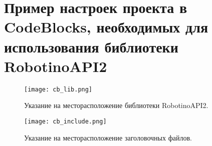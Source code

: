 \chapter{Пример настроек проекта в CodeBlocks, необходимых для использования библиотеки RobotinoAPI2}\label{app_codeblocks_settings}

\begin{figure}[h!]
	\centering
	\texttt{[image: cb\_lib.png]}
	\caption{Указание на месторасположение библиотеки RobotinoAPI2.}
\end{figure}

\begin{figure}[h!]
	\centering
	\texttt{[image: cb\_include.png]}
	\caption{Указание на месторасположение заголовочных файлов.}
\end{figure}